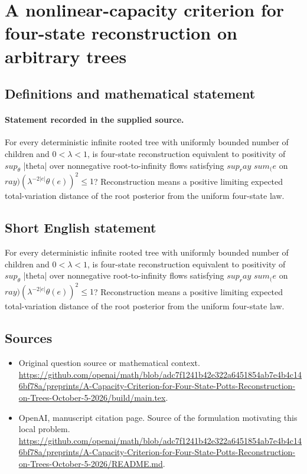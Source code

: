 \documentclass[11pt]{article}
\begin{document}
\section*{A nonlinear-capacity criterion for four-state reconstruction on arbitrary trees}\label{30007360}
\subsection{Definitions and mathematical statement}
\paragraph{Statement recorded in the supplied source.}
For every deterministic infinite rooted tree with uniformly bounded number of children and $0<\lambda <1$, is four-state reconstruction equivalent to positivity of $sup_\theta $ |theta| over nonnegative root-to-infinity flows satisfying $sup_ray$ $sum_(e$ on $ray)(\lambda ^{-2|e|}\theta (e))^2\leq 1$? Reconstruction means a positive limiting expected total-variation distance of the root posterior from the uniform four-state law.
\subsection{Short English statement}
For every deterministic infinite rooted tree with uniformly bounded number of children and $0<\lambda <1$, is four-state reconstruction equivalent to positivity of $sup_\theta $ |theta| over nonnegative root-to-infinity flows satisfying $sup_ray$ $sum_(e$ on $ray)(\lambda ^{-2|e|}\theta (e))^2\leq 1$? Reconstruction means a positive limiting expected total-variation distance of the root posterior from the uniform four-state law.
\subsection{Sources}
\begin{itemize}
\item[S1] Original question source or mathematical context.
\url{https://github.com/openai/math/blob/adc7f1241b42e322a6451854ab7e4b4c146bf78a/preprints/A-Capacity-Criterion-for-Four-State-Potts-Reconstruction-on-Trees-October-5-2026/build/main.tex}.
\item[S2] OpenAI, manuscript citation page. Source of the formulation motivating this local problem.
\url{https://github.com/openai/math/blob/adc7f1241b42e322a6451854ab7e4b4c146bf78a/preprints/A-Capacity-Criterion-for-Four-State-Potts-Reconstruction-on-Trees-October-5-2026/README.md}.
\end{itemize}
\end{document}
